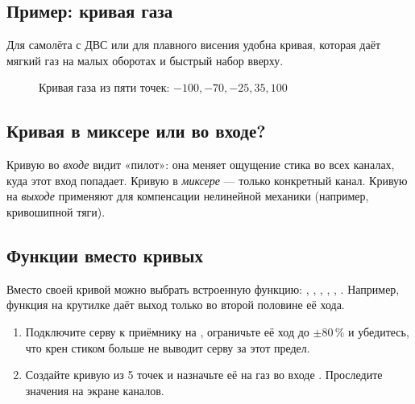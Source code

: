 \subsection{Пример: кривая газа}

Для самолёта с ДВС или для плавного висения удобна кривая, которая даёт мягкий газ на
малых оборотах и быстрый набор вверху.

\begin{figure}[H]
\centering
{}
\caption{Кривая газа из пяти точек: $-100, -70, -25, 35, 100$}
\end{figure}

\subsection{Кривая в миксере или во входе?}

Кривую во \emph{входе} видит «пилот»: она меняет ощущение стика во всех каналах, куда этот
вход попадает. Кривую в \emph{миксере} --- только конкретный канал. Кривую на \emph{выходе}
применяют для компенсации нелинейной механики (например, кривошипной тяги).

\subsection{Функции вместо кривых}

Вместо своей кривой можно выбрать встроенную функцию: , , ,
, , . Например, функция  на крутилке даёт
выход только во второй половине её хода.

\begin{tasks}
\begin{enumerate}
  \item Подключите серву к приёмнику на , ограничьте её ход до $\pm80\,\%$ и
        убедитесь, что крен стиком больше не выводит серву за этот предел.
  \item Создайте кривую из 5 точек и назначьте её на газ во входе . Проследите
        значения на экране каналов.
\end{enumerate}
\end{tasks}
